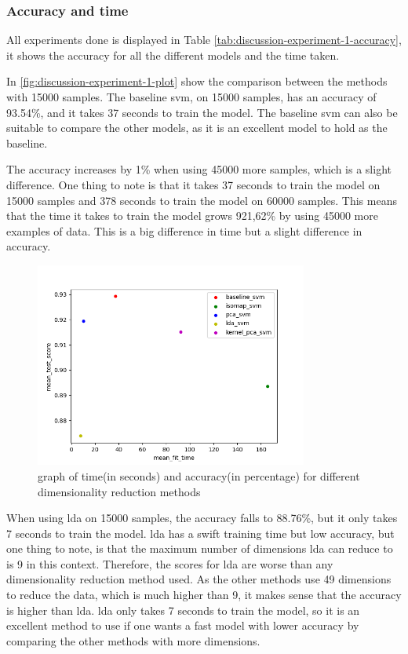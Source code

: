 \subsubsection{Accuracy and time}\label{subsec:discussion-experiment-1-accuracy}
All experiments done is displayed in Table \ref{tab:discussion-experiment-1-accuracy}, it shows the accuracy for all the different models and the time taken.



In \autoref{fig:discussion-experiment-1-plot} show the comparison between the methods with 15000 samples. The baseline \gls{svm}, on 15000 samples, has an accuracy of 93.54\%, and it takes 37 seconds to train the model. The baseline \gls{svm} can also be suitable to compare the other models, as it is an excellent model to hold as the baseline.

The accuracy increases by 1\% when using 45000 more samples, which is a slight difference. One thing to note is that it takes 37 seconds to train the model on 15000 samples and 378 seconds to train the model on 60000 samples. This means that the time it takes to train the model grows 921,62\% by using 45000 more examples of data. This is a big difference in time but a slight difference in accuracy.


\begin{figure}[htb!]
    \centering
    \includegraphics[width=0.8\textwidth]{figures/1-experiment/experiment1_plot.png}
    \caption{graph of time(in seconds) and accuracy(in percentage) for different dimensionality reduction methods}
    \label{fig:discussion-experiment-1-plot}
\end{figure}


When using \gls{lda} on 15000 samples, the accuracy falls to 88.76\%, but it only takes 7 seconds to train the model. \gls{lda} has a swift training time but low accuracy, but one thing to note, is that the maximum number of dimensions \gls{lda} can reduce to is 9 in this context. Therefore, the scores for \gls{lda} are worse than any dimensionality reduction method used. As the other methods use 49 dimensions to reduce the data, which is much higher than 9, it makes sense that the accuracy is higher than \gls{lda}. \gls{lda} only takes 7 seconds to train the model, so it is an excellent method to use if one wants a fast model with lower accuracy by comparing the other methods with more dimensions.

